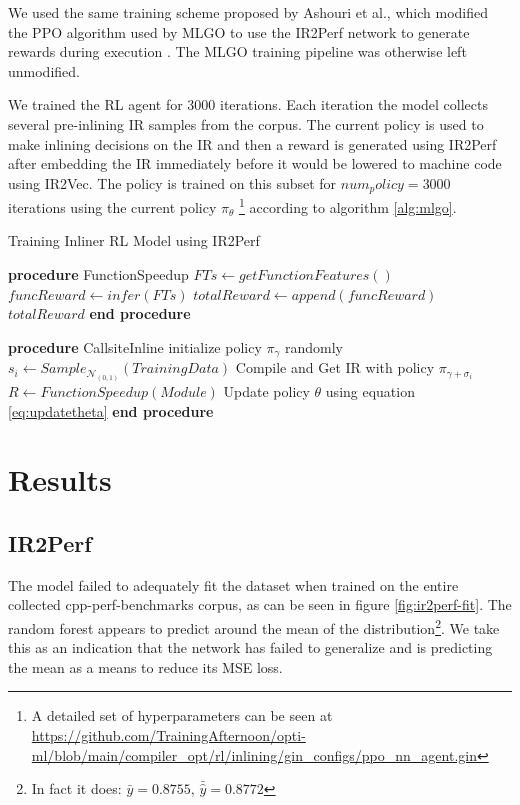 \documentclass[nohyperref]{article}
\theoremstyle{plain}
\theoremstyle{definition}
\theoremstyle{remark}
\begin{document}
We used the same training scheme proposed by Ashouri et al., which modified the PPO algorithm used by MLGO to use the IR2Perf network to generate rewards during execution \cite{mlgoperf}. The MLGO training pipeline was otherwise left unmodified.

We trained the RL agent for 3000 iterations. Each iteration the model collects several pre-inlining IR samples from the corpus. The current policy is used to make inlining decisions on the IR and then a reward is generated using IR2Perf after embedding the IR immediately before it would be lowered to machine code using IR2Vec. The policy is trained on this subset for $num_policy=3000$ iterations using the current policy $\pi_{\theta}$ \footnote{A detailed set of hyperparameters can be seen at \href{https://github.com/TrainingAfternoon/opti-ml/blob/main/compiler\_opt/rl/inlining/gin\_configs/ppo\_nn\_agent.gin}{https://github.com/TrainingAfternoon/opti-ml/blob/main/compiler\_opt/rl/inlining/gin\_configs/ppo\_nn\_agent.gin}} according to algorithm \ref{alg:mlgo}.

\begin{algorithm}
    \caption{Training Inliner RL Model using IR2Perf}
    \label{alg:mlgo}
\begin{algorithmic}
    \STATE \textbf{procedure} FunctionSpeedup
       \STATE $FTs \leftarrow getFunctionFeatures()$
       \STATE $funcReward \leftarrow infer(FTs)$
       \STATE $totalReward \leftarrow append(funcReward)$
       \ENDFOR
       \RETURN $totalReward$
    \STATE \textbf{end procedure}
\end{algorithmic}
\;
\;
\begin{algorithmic}
    \STATE \textbf{procedure} CallsiteInline
        \STATE initialize policy $\pi_{\gamma}$ randomly
        \STATE $s_i \leftarrow Sample_{\mathcal{N}_{(0,1)}}(TrainingData)$
        \STATE Compile and Get IR with policy $\pi_{\gamma + \sigma_i}$
        \STATE $R \leftarrow FunctionSpeedup(Module)$
        \STATE Update policy $\theta$ using equation \ref{eq:updatetheta}
        \ENDFOR
    \STATE \textbf{end procedure}
\end{algorithmic}
\end{algorithm}

\section{Results}
\label{results}
\subsection{IR2Perf}
The model failed to adequately fit the dataset when trained on the entire collected cpp-perf-benchmarks corpus, as can be seen in figure \ref{fig:ir2perf-fit}. The random forest appears to predict around the mean of the distribution\footnote{In fact it does: $\bar{y} = 0.8755$, $\bar{\hat{y}} = 0.8772$}. We take this as an indication that the network has failed to generalize and is predicting the mean as a means to reduce its MSE loss.
\end{document}
